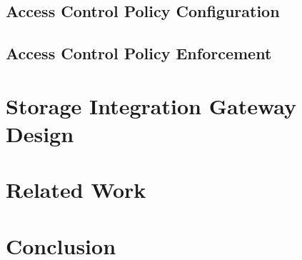 \documentclass[conference]{IEEEtran}
\begin{document}
\subsection{Access Control Policy Configuration}

\subsection{Access Control Policy Enforcement}       

\section{Storage Integration Gateway Design}
\label{s-gate}

\section{Related Work}
\label{s-rw}

\section{Conclusion}
\label{s-con}
 


\end{document}
